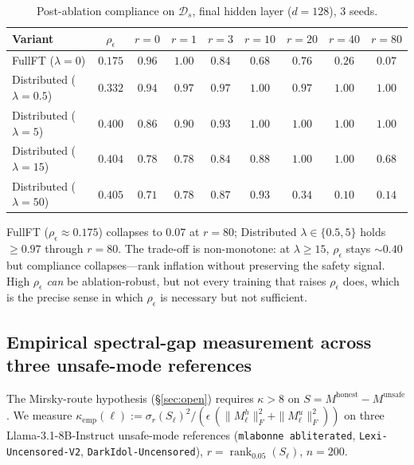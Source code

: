 \documentclass[10pt]{article}
\theoremstyle{definition}
\theoremstyle{remark}
\begin{document}
\begin{table}[h]\centering
\caption{Post-ablation compliance on $\mathcal{D}_s$,
final hidden layer ($d=128$), $3$ seeds.}
\label{tab:calibration_v2_ablation}
\begin{tabular}{@{}lcccccccc@{}}
\toprule
Variant & $\rho_{\epsilon}$
        & $r{=}0$ & $r{=}1$ & $r{=}3$ & $r{=}10$
        & $r{=}20$ & $r{=}40$ & $r{=}80$ \\
\midrule
FullFT ($\lambda{=}0$)        & $0.175$ & $0.96$ & $1.00$ & $0.84$ & $0.68$ & $0.76$ & $0.26$ & $0.07$ \\
Distributed ($\lambda{=}0.5$) & $0.332$ & $0.94$ & $0.97$ & $0.97$ & $1.00$ & $0.97$ & $1.00$ & $1.00$ \\
Distributed ($\lambda{=}5$)   & $0.400$ & $0.86$ & $0.90$ & $0.93$ & $1.00$ & $1.00$ & $1.00$ & $1.00$ \\
Distributed ($\lambda{=}15$)  & $0.404$ & $0.78$ & $0.78$ & $0.84$ & $0.88$ & $1.00$ & $1.00$ & $0.68$ \\
Distributed ($\lambda{=}50$)  & $0.405$ & $0.71$ & $0.78$ & $0.87$ & $0.93$ & $0.34$ & $0.10$ & $0.14$ \\
\bottomrule
\end{tabular}
\end{table}

FullFT ($\rho_{\epsilon}\!\approx\!0.175$) collapses to
$0.07$ at $r{=}80$; Distributed
$\lambda\in\{0.5,5\}$ holds $\geq 0.97$ through $r{=}80$.
The trade-off is non-monotone: at $\lambda \geq 15$,
$\rho_{\epsilon}$ stays $\sim 0.40$ but compliance
collapses---rank inflation without preserving the
safety signal.  High $\rho_{\epsilon}$ \emph{can} be
ablation-robust, but not every training that raises
$\rho_{\epsilon}$ does, which is the precise sense in
which $\rho_{\epsilon}$ is necessary but not sufficient.

\subsection{Empirical spectral-gap measurement across three unsafe-mode references}
\label{app:kappa}

The Mirsky-route hypothesis (\S\ref{sec:open}) requires
$\kappa > 8$ on $S = M^{\mathrm{honest}} - M^{\mathrm{unsafe}}$.
We measure $\kappa_{\mathrm{emp}}(\ell) :=
\sigma_r(S_\ell)^2 / (\epsilon\,(\|M^h_\ell\|_F^2
+ \|M^u_\ell\|_F^2))$ on three Llama-3.1-8B-Instruct
unsafe-mode references (\texttt{mlabonne abliterated},
\texttt{Lexi-Uncensored-V2}, \texttt{DarkIdol-Uncensored}),
$r = \operatorname{rank}_{0.05}(S_\ell)$, $n=200$.
\end{document}
